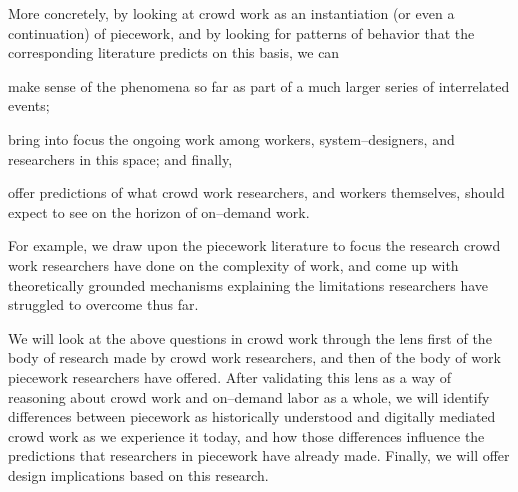 \documentclass[trackingWork]{subfiles}
\begin{document}
More concretely, by looking at crowd work as
an instantiation (or even a continuation) of piecework,
and by looking for patterns of behavior that the corresponding literature predicts
on this basis, we can
\begin{inlinelist}
  \item make sense of the phenomena so far as part of a much larger series of interrelated events;
  \item bring into focus the ongoing work among
        workers,
        system--designers, and
        researchers in this space;
        and finally,
  \item offer predictions of what crowd work researchers,
        and workers themselves,
        should expect to see on the horizon of on--demand work.
\end{inlinelist}
For example,
we draw upon the piecework literature to focus the research crowd work researchers have done on the complexity of work,
and come up with theoretically grounded mechanisms explaining the limitations researchers have struggled to overcome thus far.


We will look at the above questions in crowd work through the lens
first of the body of research made by crowd work researchers,
and then of the body of work piecework researchers have offered.
After validating this lens as a way of reasoning about crowd work and on--demand labor as a whole,
we will identify differences between piecework as historically understood and
digitally mediated crowd work as we experience it today,
and how those differences influence the predictions that researchers in piecework have already made.
Finally, we will offer design implications based on this research.


\onlyinsubfile{
  \balance{}
  \printbibliography
}
\end{document}
